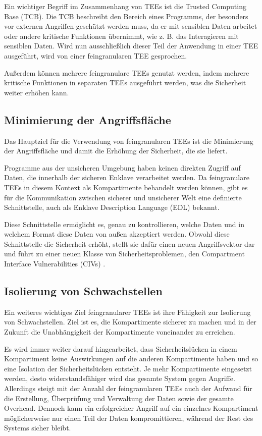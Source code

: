 Ein wichtiger Begriff im Zusammenhang von TEEs ist die Trusted Computing Base (TCB). Die TCB beschreibt den Bereich eines Programms, der besonders vor externen Angriffen geschützt werden muss, da er mit sensiblen Daten arbeitet oder andere kritische Funktionen übernimmt, wie z. B. das Interagieren mit sensiblen Daten. Wird nun ausschließlich dieser Teil der Anwendung in einer TEE ausgeführt, wird von einer feingranularen TEE gesprochen.

Außerdem können mehrere feingranulare TEEs genutzt werden, indem mehrere kritische Funktionen in separaten TEEs ausgeführt werden, was die Sicherheit weiter erhöhen kann.

\subsection{Minimierung der Angriffsfläche}
Das Hauptziel für die Verwendung von feingranularen TEEs ist die Minimierung der Angriffsfläche und damit die Erhöhung der Sicherheit, die sie liefert. 

Programme aus der unsicheren Umgebung haben keinen direkten Zugriff auf Daten, die innerhalb der sicheren Enklave verarbeitet werden. Da feingranulare TEEs in diesem Kontext als Kompartimente behandelt werden können, gibt es für die Kommunikation zwischen sicherer und unsicherer Welt eine definierte Schnittstelle, auch als Enklave Description Language (EDL) bekannt. 

Diese Schnittstelle ermöglicht es, genau zu kontrollieren, welche Daten und in welchem Format diese Daten von außen akzeptiert werden. Obwohl diese Schnittstelle die Sicherheit erhöht, stellt sie dafür einen neuen Angriffsvektor dar und führt zu einer neuen Klasse von Sicherheitsproblemen, den Compartment Interface Vulnerabilities (CIVs) \cite{CIVPaper}.

\subsection{Isolierung von Schwachstellen}
Ein weiteres wichtiges Ziel feingranularer TEEs ist ihre Fähigkeit zur Isolierung von Schwachstellen. Ziel ist es, die Kompartimente sicherer zu machen und in der Zukunft die Unabhängigkeit der Kompartimente voneinander zu erreichen.


Es wird immer weiter darauf hingearbeitet, dass Sicherheitslücken in einem Kompartiment keine Auswirkungen auf die anderen Kompartimente haben und so eine Isolation der Sicherheitslücken entsteht. Je mehr Kompartimente eingesetzt werden, desto widerstandsfähiger wird das gesamte System gegen Angriffe. Allerdings steigt mit der Anzahl der feingranularen TEEs auch der Aufwand für die Erstellung, Überprüfung und Verwaltung der Daten sowie der gesamte Overhead. Dennoch kann ein erfolgreicher Angriff auf ein einzelnes Kompartiment möglicherweise nur einen Teil der Daten kompromittieren, während der Rest des Systems sicher bleibt.
